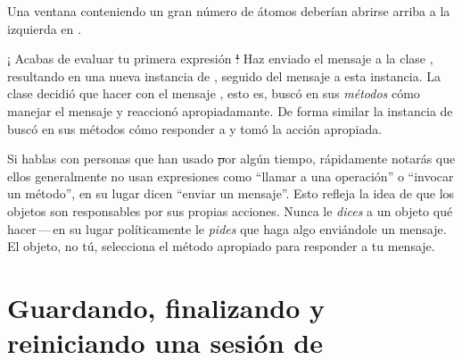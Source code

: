 \documentclass[a4paper,10pt,twoside]{book}
\begin{document}
Una ventana conteniendo un gran n\'umero de \'atomos deber\'ian abrirse arriba a la izquierda en \pharo.

¡ Acabas de evaluar tu primera expresi\'on \st !
Haz enviado el mensaje  a la clase \bam, resultando en una nueva instancia de \bam, seguido del mensaje  a esta instancia.
La clase \bam decidi\'o que hacer con el mensaje , esto es, busc\'o en sus \emph{m\'etodos} c\'omo manejar el mensaje  y reaccion\'o apropiadamante.
De forma similar la instancia de \bam busc\'o en sus m\'etodos c\'omo responder a  y tom\'o la acci\'on apropiada.

Si hablas con personas que han usado \st por alg\'un tiempo, r\'apidamente notar\'as que ellos generalmente no usan expresiones como ``llamar a una operaci\'on'' o ``invocar un m\'etodo'', en su lugar dicen ``enviar un mensaje''.
Esto refleja la idea de que los objetos son responsables por sus propias acciones.
Nunca le \emph{dices} a un objeto qu\'e hacer\,---\,en su lugar pol\'iticamente le \emph{pides} que haga algo envi\'andole un mensaje.
El objeto, no t\'u, selecciona el m\'etodo apropiado para responder a tu mensaje.

\section{Guardando, finalizando y reiniciando una sesi\'on de \pharo}

\end{document}
